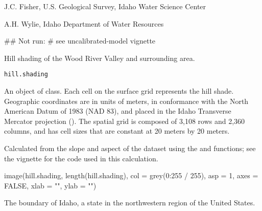 \documentclass[letterpaper]{book}
\begin{document}
%
\begin{Author}\relax
J.C. Fisher, U.S. Geological Survey, Idaho Water Science Center

A.H. Wylie, Idaho Department of Water Resources
\end{Author}
%
\begin{Examples}
\begin{ExampleCode}
## Not run: # see uncalibrated-model vignette
\end{ExampleCode}
\end{Examples}
%
\begin{Description}\relax
Hill shading of the Wood River Valley and surrounding area.
\end{Description}
%
\begin{Usage}
\begin{verbatim}
hill.shading
\end{verbatim}
\end{Usage}
%
\begin{Format}
An object of  class.
Each cell on the surface grid represents the hill shade.
Geographic coordinates are in units of meters, in conformance with the North American Datum of 1983 (NAD 83), and placed in the
Idaho Transverse Mercator projection ().
The spatial grid is composed of 3,108 rows and 2,360 columns, and has cell sizes that are constant at 20 meters by 20 meters.
\end{Format}
%
\begin{Source}\relax
Calculated from the slope and aspect of the  dataset using the  and  functions;
see the  vignette for the \R{} code used in this calculation.
\end{Source}
%
\begin{Examples}
\begin{ExampleCode}
image(hill.shading, length(hill.shading), col = grey(0:255 / 255), asp = 1,
      axes = FALSE, xlab = "", ylab = "")
\end{ExampleCode}
\end{Examples}
%
\begin{Description}\relax
The boundary of Idaho, a state in the northwestern region of the United States.
\end{Description}
\end{document}
